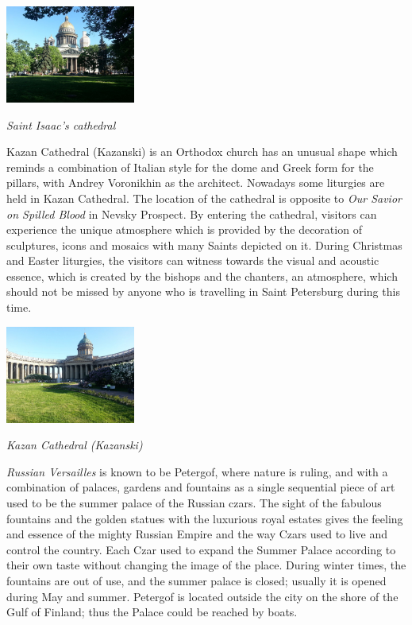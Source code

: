 \documentclass[10pt,a4paper]{article} %
\begin{document}
\begin{multicols}{3}
\begin{center}
	\includegraphics[width=0.32\textwidth]{media/isaccs_cathedral.jpg}
	\par\textit{Saint Isaac's cathedral}
\end{center}

Kazan Cathedral (Kazanski) is an Orthodox church has an unusual shape which 
reminds a combination of Italian style for the dome and Greek form for the pillars, 
with Andrey Voronikhin as the architect. 
Nowadays some liturgies are held in Kazan Cathedral. 
The location of the cathedral is opposite to \textit{Our Savior on Spilled Blood} 
in Nevsky Prospect. 
By entering the cathedral, visitors can experience the unique atmosphere 
which is provided by the decoration of sculptures, 
icons and mosaics with many Saints depicted on it. 
During Christmas and Easter liturgies, the visitors can witness towards the visual
and acoustic essence, which is created by the bishops and the chanters, an atmosphere, 
which should not be missed by anyone who is travelling in Saint Petersburg during this time.

\begin{center}
	\includegraphics[width=0.32\textwidth]{media/kazan.jpg}
	\par\textit{Kazan Cathedral (Kazanski)}
\end{center}

\textit{Russian Versailles} is known to be Petergof, 
where nature is ruling, and with a combination of palaces, 
gardens and fountains as a single sequential piece of art used to be the summer palace 
of the Russian czars. 
The sight of the fabulous fountains and the golden statues with the luxurious 
royal estates gives the feeling and essence of the mighty Russian Empire and 
the way Czars used to live and control the country. 
Each Czar used to expand the Summer Palace according to their own taste without 
changing the image of the place. During winter times,
the fountains are out of use, and the summer palace is closed;
usually it is opened during May and summer.
Petergof is located outside the city on the shore of the Gulf of Finland; 
thus the Palace could be reached by boats.


\end{multicols}
\end{document}
